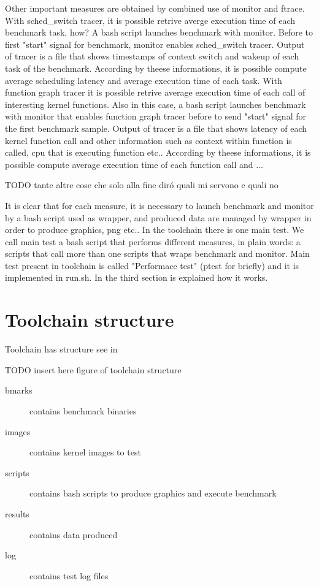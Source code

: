 \documentclass[a4paper,10pt]{article}
\begin{document}
\begin{multicols}{2}
Other important measures are obtained by combined use of monitor and ftrace.
With sched\_switch tracer, it is possible retrive averge execution time of each
benchmark task, how? A bash script launches benchmark with monitor. 
Before to first "start" signal for benchmark, monitor enables sched\_switch tracer. 
Output of  tracer is a file that shows timestamps of context switch and 
wakeup of each task of the benchmark. According by theese informations, it is possible 
compute average scheduling latency and average execution time of each task.
With function graph tracer it is possible retrive average execution time of each
call of interesting kernel functions. Also in this case, a bash script launches
benchmark with monitor that enables function graph tracer before to send "start" signal
for the first benchmark sample. Output of tracer is a file that shows latency of each
kernel function call and other information such as context within function is called,
cpu that is executing function etc..
According by theese informations, it is possible compute average execution time of each 
function call and ...

TODO tante altre cose che solo alla fine dir\'o quali mi servono e quali no

It is clear that for each measure, it is necessary to launch benchmark and monitor by 
a bash script used as wrapper, and produced data are managed by wrapper in order
to produce graphics, png etc..
In the toolchain there is one main test. We call main test a bash script that 
performs different measures, in plain words: a scripts that call more than one
scripts that wraps benchmark and monitor. Main test present in toolchain 
is called "Performace test" (ptest for briefly)
and it is implemented in run.sh. In the third section is explained how it works. 

\section{Toolchain structure}

Toolchain has structure see in 

TODO insert here figure of toolchain structure

\begin{description}
	\item[bmarks] contains benchmark binaries 
	\item[images] contains kernel images to test
	\item[scripts] contains bash scripts to produce graphics and execute benchmark
	\item[results] contains data produced
	\item[log] contains test log files
\end{description}


\end{multicols}
\end{document}
